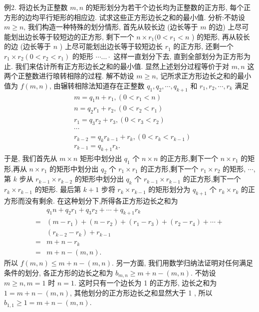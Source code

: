 例2. 将边长为正整数 $m, n$ 的矩形划分为若干个边长均为正整数的正方形, 每个正方形的边均平行矩形的相应边.
试求这些正方形边长之和的最小值.
分析:不妨设 $m \geqslant n$, 我们构造一种特殊的划分情形, 首先从较长边 (边长等于 $m$ 的边) 上尽可能划出边长等于较短边的正方形, 剩下一个 $n \times r_1(0< r_1<n$ ) 的矩形, 再从较长的边 (边长等于 $n$ ) 上尽可能划出边长等于较短边长 $r_1$ 的正方形, 还剩一个 $r_1 \times r_2\left(0<r_2<r_1\right)$ 的矩形 $\cdots . . . \cdot$ 这样一直划分下去, 直到全部划分为正方形为止.
我们来估计所有正方形边长之和的最小值.
显然上述划分过程等价于对 $m, n$ 这两个正整数进行㫰转相除的过程.
解不妨设 $m \geqslant n$, 记所求正方形边长之和的最小值为 $f(m, n)$, 由辗转相除法知道存在正整数 $q_1, q_2, \cdots, q_{k+1}$ 和 $r_1, r_2, \cdots, r_k$ 满足
$$
\begin{aligned}
& m=q_1 n+r_1,\left(0<r_1<n\right) \\
& n=q_2 r_1+r_2,\left(0<r_2<r_1\right) \\
& r_1=q_3 r_2+r_3,\left(0<r_3<r_2\right) \\
& \cdots \\
& r_{k-2}=q_k r_{k-1}+r_k,\left(0<r_k<r_{k-1}\right) \\
& r_{k-1}=q_{k+1} r_k .
\end{aligned}
$$
于是, 我们首先从 $m \times n$ 矩形中划分出 $q_1$ 个 $n \times n$ 的正方形,剩下一个 $n \times r_1$ 的矩形,再从 $n \times r_1$ 的矩形中划分出 $q_2$ 个 $r_1 \times r_1$ 的正方形,剩下一个 $r_1 \times r_2$ 的矩形, $\cdots$,第 $k$ 步从 $r_{k-1} \times r_{k-2}$ 的矩形中划分出 $q_k$ 个 $r_{k-1} \times r_{k-1}$ 的正方形,剩下一个 $r_k \times r_{k-1}$ 的矩形.
最后第 $k+1$ 步将 $r_k \times r_{k-1}$ 的矩形划分为 $q_{k+1}$ 个 $r_k \times r_k$ 的正方形而没有剩余.
在这种划分下,所得各正方形边长之和为
$$
\begin{aligned}
& q_1 n+q_2 r_1+q_3 r_2+\cdots+q_{k+1} r_k \\
= & \left(m-r_1\right)+\left(n-r_2\right)+\left(r_1-r_3\right)+\left(r_2-r_4\right)+\cdots+ \\
& \left(r_{k-2}-r_k\right)+r_{k-1} \\
= & m+n-r_k \\
= & m+n-(m, n) .
\end{aligned}
$$
所以 $f(m, n) \leqslant m+n-(m, n)$.
另一方面, 我们用数学归纳法证明对任何满足条件的划分, 各正方形的边长之和为 $b_{m, n} \geqslant m+n-(m, n)$.
不妨设 $m \geqslant n, m=1$ 时 $n=1$. 这时只有一个边长为 1 的正方形, 边长之和为 $1=m+n-(m, n)$, 其他划分的正方形边长之和显然大于 1 , 所以 $b_{1,1} \geqslant 1=m+n-(m, n)$.
